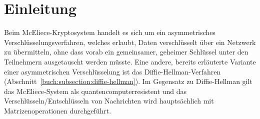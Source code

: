 %
%
%
\section{Einleitung
\label{mceliece:section:einleitung}}
Beim McEliece-Kryptosystem handelt es sich um ein asymmetrisches Verschlüsselungsverfahren, welches erlaubt,
%
%
%
%
Daten verschlüsselt über ein Netzwerk zu übermitteln, ohne dass vorab ein gemeinsamer,
geheimer Schlüssel unter den Teilnehmern ausgetauscht werden müsste.
Eine andere, bereits erläuterte Variante einer asymmetrischen Verschlüsselung ist das Diffie-Hellman-Verfahren (Abschnitt~\ref{buch:subsection:diffie-hellman}).
Im Gegensatz zu Diffie-Hellman gilt das McEliece-System als quantencomputerresistent
%
und das Verschlüsseln/Entschlüsseln von Nachrichten wird hauptsächlich mit Matrizenoperationen durchgeführt.


